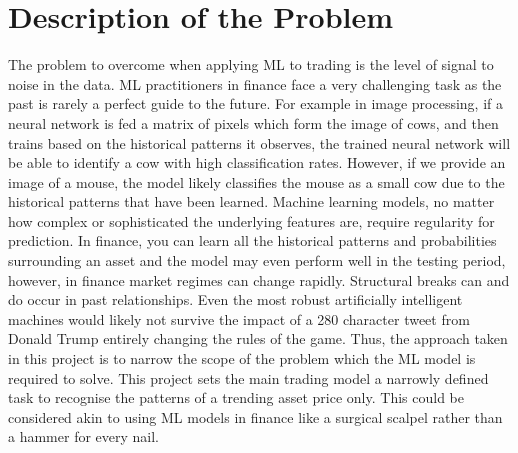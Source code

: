 \documentclass[11pt]{article}
\begin{document}
\section{Description of the Problem} \label{ProbDes}

The problem to overcome when applying ML to trading is the level of signal to noise in the data. ML practitioners in finance face a very challenging task as the past is rarely a perfect guide to the future. For example in image processing, if a neural network is fed a matrix of pixels which form the image of cows, and then trains based on the historical patterns it observes, the trained neural network will be able to identify a cow with high classification rates. However, if we provide an image of a mouse, the model likely classifies the mouse as a small cow due to the historical patterns that have been learned. Machine learning models, no matter how complex or sophisticated the underlying features are, require regularity for prediction. \newline In finance, you can learn all the historical patterns and probabilities surrounding an asset and the model may even perform well in the testing period, however, in finance market regimes can change rapidly. Structural breaks can and do occur in past relationships. Even the most robust artificially intelligent machines would likely not survive the impact of a 280 character tweet from Donald Trump entirely changing the rules of the game. Thus, the approach taken in this project is to narrow the scope of the problem which the ML model is required to solve. This project sets the main trading model a narrowly defined task to recognise the patterns of a trending asset price only. This could be considered akin to using ML models in finance like a surgical scalpel rather than a hammer for every nail.
\end{document}

